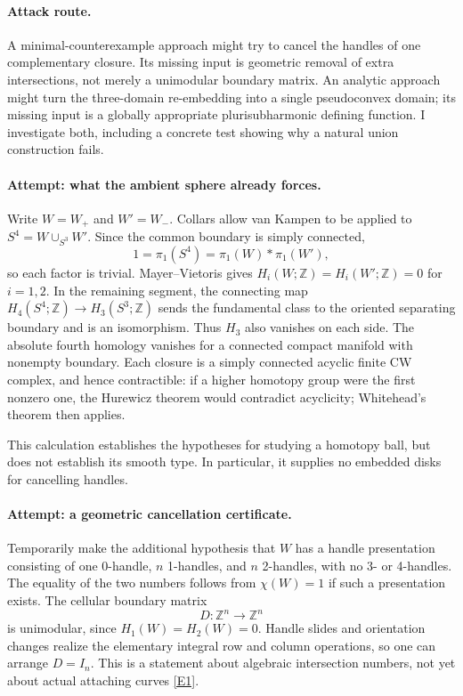 \documentclass[11pt,a4paper]{article}
\newcommand{\Z}{\mathbb{Z}}
\newcommand{\eref}[2]{\hyperlink{extra:#1:#2}{[E#2]}}
\numberwithin{equation}{section}
\begin{document}
\paragraph{Attack route.}
A minimal-counterexample approach might try to cancel the handles of
one complementary closure. Its missing input is geometric removal of
extra intersections, not merely a unimodular boundary matrix. An
analytic approach might turn the three-domain re-embedding into a
single pseudoconvex domain; its missing input is a globally appropriate
plurisubharmonic defining function. I investigate both, including a
concrete test showing why a natural union construction fails.

\paragraph{Attempt: what the ambient sphere already forces.}
Write $W=W_+$ and $W'=W_-$. Collars allow van Kampen to be applied to
$S^4=W\cup_{S^3}W'$. Since the common boundary is simply connected,
\begin{equation}
  1=\pi_1(S^4)=\pi_1(W)*\pi_1(W'),
\end{equation}
so each factor is trivial. Mayer--Vietoris gives $H_i(W;\Z)=
H_i(W';\Z)=0$ for $i=1,2$. In the remaining segment, the connecting
map $H_4(S^4;\Z)\to H_3(S^3;\Z)$ sends the fundamental class to the
oriented separating boundary and is an isomorphism. Thus $H_3$ also
vanishes on each side. The absolute fourth homology vanishes for a
connected compact manifold with nonempty boundary. Each closure is a
simply connected acyclic finite CW complex, and hence contractible:
if a higher homotopy group were the first nonzero one, the Hurewicz
theorem would contradict acyclicity; Whitehead's theorem then applies.

This calculation establishes the hypotheses for studying a homotopy
ball, but does not establish its smooth type. In particular, it supplies
no embedded disks for cancelling handles.

\paragraph{Attempt: a geometric cancellation certificate.}
Temporarily make the additional hypothesis that $W$ has a handle
presentation consisting of one 0-handle, $n$ 1-handles, and $n$ 2-handles,
with no 3- or 4-handles. The equality of the two numbers follows from
$\chi(W)=1$ if such a presentation exists. The cellular boundary matrix
\begin{equation}
 D:\Z^n\longrightarrow\Z^n
\end{equation}
is unimodular, since $H_1(W)=H_2(W)=0$. Handle slides and orientation
changes realize the elementary integral row and column operations, so
one can arrange $D=I_n$. This is a statement about algebraic intersection
numbers, not yet about actual attaching curves \eref{statement}{1}.
\end{document}

